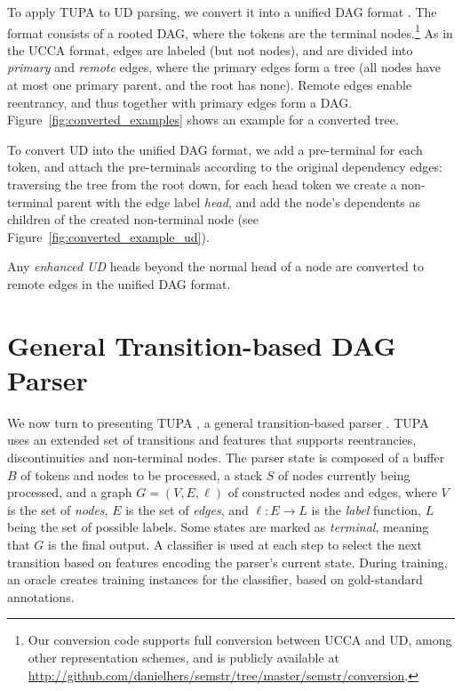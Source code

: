 \documentclass[11pt,a4paper]{article}
\begin{document}
To apply TUPA to UD parsing,
we convert it into a unified DAG format \cite{hershcovich2018multitask}.
The format consists of a rooted DAG, where the tokens are the terminal
nodes.\footnote{Our conversion code supports full conversion between UCCA and UD,
among other representation schemes,
and is publicly available at \url{http://github.com/danielhers/semstr/tree/master/semstr/conversion}.}
As in the UCCA format, edges are labeled (but not nodes),
and are divided into \textit{primary} and \textit{remote} edges,
where the primary edges form a tree (all nodes have at most one primary parent,
and the root has none).
Remote edges enable reentrancy, and thus together with primary edges
form a DAG.
Figure~\ref{fig:converted_examples} shows an example for a converted tree.

To convert UD into the unified DAG format,
we add a pre-terminal for each token,
and attach the pre-terminals according to the original dependency edges:
traversing the tree from the root down, for each head token we create a non-terminal
parent with the edge label {\it head},
and add the node's dependents as children of the created non-terminal node
(see Figure~\ref{fig:converted_example_ud}).

Any \textit{enhanced UD} heads beyond the normal head of a node are converted
to remote edges in the unified DAG format.



\section{General Transition-based DAG Parser}\label{sec:model}

We now turn to presenting TUPA \cite{hershcovich2017a,hershcovich2018multitask},
a general transition-based parser \cite{Nivre03anefficient}.
TUPA uses an extended set of transitions and features that supports
reentrancies, discontinuities and non-terminal nodes.
The parser state is composed of a buffer $B$ of tokens and nodes to be processed,
a stack $S$ of nodes currently being processed,
and a graph $G=(V,E,\ell)$ of constructed nodes and edges,
where $V$ is the set of \emph{nodes}, $E$ is the set of \emph{edges},
and $\ell : E \to L$ is the \emph{label} function, $L$ being the set of possible labels.
Some states are marked as \textit{terminal}, meaning that $G$ is the final output.
A classifier is used at each step to select the next transition based on features
encoding the parser's current state.
During training, an oracle creates training instances for the classifier,
based on gold-standard annotations.
\end{document}

